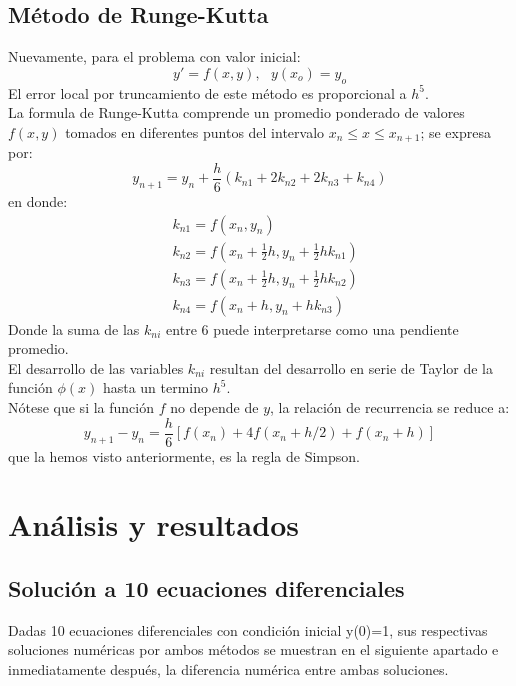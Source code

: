 \documentclass[10pt]{article}
\begin{document}
\begin{multicols}{2}
			\subsection{Método de Runge-Kutta}
				Nuevamente, para el problema con valor inicial:
				$$y'=f(x,y),\text{		}y(x_o)=y_o$$
				El error local por truncamiento de este método es proporcional a $h^5$.\\
				La formula de Runge-Kutta comprende un promedio ponderado de valores $f(x,y)$ tomados en diferentes puntos del intervalo $x_n\leq x\leq x_{n+1}$; se expresa por:
				$$y_{n+1}=y_n+\frac{h}{6}\left( k_{n1}+2k_{n2}+2k_{n3}+k_{n4} \right)$$
				en donde:
				\begin{equation*}
					\begin{split}
						&k_{n1}=f(x_n,y_n)\\
						&k_{n2}=f\left(x_n+\frac{1}{2}h,y_n+\frac{1}{2}hk_{n1}\right)\\
						&k_{n3}=f\left(x_n+\frac{1}{2}h,y_n+\frac{1}{2}hk_{n2}\right)\\
						&k_{n4}=f(x_n+h,y_n+hk_{n3})
					\end{split}
				\end{equation*}
				Donde la suma de las $k_{ni}$ entre 6 puede interpretarse como una pendiente promedio.\\
				El desarrollo de las variables $k_{ni}$ resultan del desarrollo en serie de Taylor de la función $\phi(x)$ hasta un termino $h^5$.\\
				Nótese que si la función $f$ no depende de $y$, la relación de recurrencia se reduce a:
				$$y_{n+1}-y_n=\frac{h}{6}\left[ f(x_n)+4f(x_n+h/2)+f(x_n+h) \right]$$
				que la hemos visto anteriormente, es la regla de Simpson.
		\section{Análisis y resultados}
			\subsection{Solución a 10 ecuaciones diferenciales}
				Dadas 10 ecuaciones diferenciales con condición inicial y(0)=1, sus respectivas soluciones numéricas por ambos métodos se muestran en el siguiente apartado e inmediatamente después, la diferencia numérica entre ambas soluciones.\\

\end{multicols}
\end{document}

